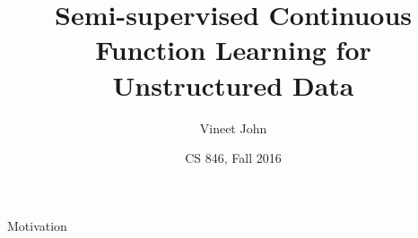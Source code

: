 \documentclass[aspectratio=169]{beamer}
\title{Semi-supervised Continuous Function Learning for Unstructured Data}
\date{CS 846, Fall 2016}
\author{Vineet John}
\begin{document}
\maketitle

\begin{frame}{Motivation}
\end{frame}
\end{document}
